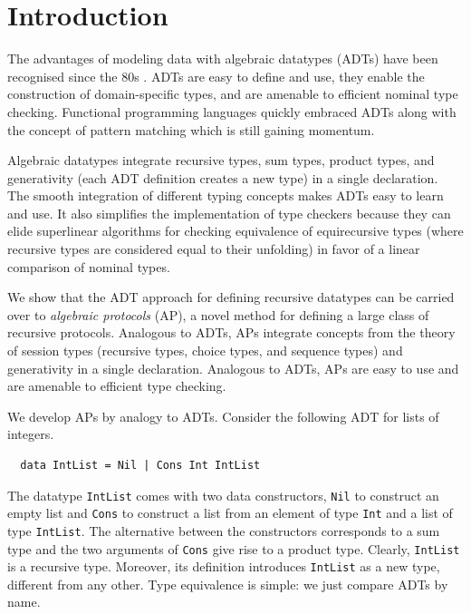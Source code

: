 \section{Introduction}
\label{sec:introduction}

The advantages of modeling data with algebraic datatypes (ADTs) 
have been recognised since the 80s 
\cite{Burstall1977a,DBLP:conf/lfp/BurstallMS80}. 
ADTs are easy to define and use, they enable the construction of
domain-specific types, and are amenable to efficient nominal type checking.
Functional programming languages quickly embraced ADTs along
with the concept of pattern matching which is still gaining momentum.  

Algebraic datatypes integrate recursive types, sum types, product
types, and generativity (each ADT definition creates a new type) in a
single declaration. The smooth integration of different typing concepts
makes ADTs easy to learn and use. It also simplifies the 
implementation of type checkers because they can elide superlinear algorithms for checking
equivalence of equirecursive types (where recursive types are
considered equal to their unfolding) in favor of a linear comparison of nominal types.

We show that the ADT approach for defining recursive
datatypes can be carried over to 
\emph{algebraic protocols} (AP), a novel method for defining a large class
of recursive protocols. Analogous to ADTs, APs integrate 
concepts from the theory of session types
\cite{DBLP:conf/concur/Honda93,DBLP:conf/parle/TakeuchiHK94}
(recursive types, choice types, and sequence types) and generativity
in a single declaration. Analogous to ADTs, APs are easy to use and
are amenable to efficient type checking. 

We develop APs by analogy to ADTs. Consider the following ADT for lists of
integers.
\begin{lstlisting}
  data IntList = Nil | Cons Int IntList
\end{lstlisting}
The datatype \lstinline+IntList+  comes with two data constructors,
\lstinline+Nil+  to construct an 
empty list and \lstinline+Cons+ to construct a list from an element
of type \lstinline+Int+ and a list of type \lstinline+IntList+. The
alternative between the constructors corresponds to a sum type and the
two arguments of \lstinline+Cons+ give rise to a product
type. Clearly, \lstinline+IntList+ is a recursive type. Moreover, its
definition introduces \lstinline+IntList+ as a new type, different
from any other. Type equivalence is simple: we just compare ADTs
by name.

